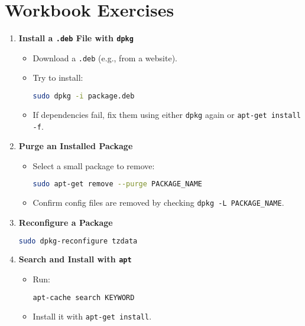 \documentclass[12pt,a4paper]{report}
\begin{document}
 

\section*{Workbook Exercises}

\begin{enumerate}
    \item \textbf{Install a \texttt{.deb} File with \texttt{dpkg}}  
    \begin{itemize}
        \item Download a \texttt{.deb} (e.g., from a website).  
        \item Try to install:  
 \begin{lstlisting}[language=bash]
sudo dpkg -i package.deb
\end{lstlisting}
        \item If dependencies fail, fix them using either \texttt{dpkg} again or \texttt{apt-get install -f}.
    \end{itemize}

    \item \textbf{Purge an Installed Package}  
    \begin{itemize}
        \item Select a small package to remove:  
 \begin{lstlisting}[language=bash]
sudo apt-get remove --purge PACKAGE_NAME
\end{lstlisting}
        \item Confirm config files are removed by checking \texttt{dpkg -L PACKAGE\_NAME}.
    \end{itemize}

    \item \textbf{Reconfigure a Package}  
 \begin{lstlisting}[language=bash]
sudo dpkg-reconfigure tzdata
\end{lstlisting}

    \item \textbf{Search and Install with \texttt{apt}}  
    \begin{itemize}
        \item Run:  
 \begin{lstlisting}[language=bash]
apt-cache search KEYWORD
\end{lstlisting}
        \item Install it with \texttt{apt-get install}.
    \end{itemize}
\end{enumerate}
\end{document}
